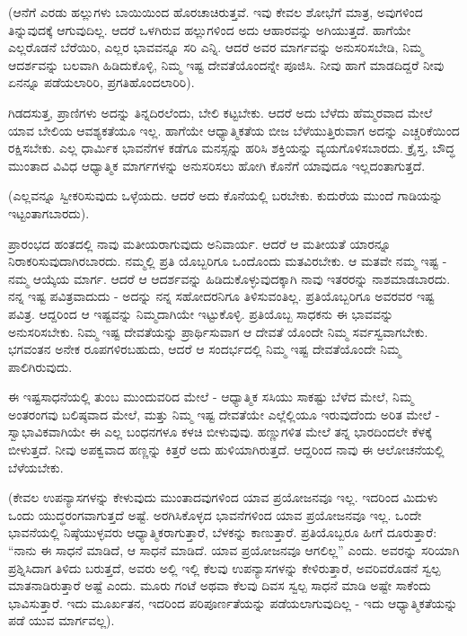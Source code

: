 (ಆನೆಗೆ ಎರಡು ಹಲ್ಲುಗಳು ಬಾಯಿಯಿಂದ ಹೊರಚಾಚಿರುತ್ತವೆ. ಇವು ಕೇವಲ ಶೋಭೆಗೆ ಮಾತ್ರ, ಅವುಗಳಿಂದ ತಿನ್ನುವುದಕ್ಕೆ ಆಗುವುದಿಲ್ಲ. ಆದರೆ ಒಳಗಿರುವ ಹಲ್ಲುಗಳಿಂದ ಅದು ಆಹಾರವನ್ನು ಅಗಿಯುತ್ತದೆ. ಹಾಗೆಯೇ ಎಲ್ಲರೊಡನೆ ಬೆರೆಯಿರಿ, ಎಲ್ಲರ ಭಾವವನ್ನೂ ಸರಿ ಎನ್ನಿ. ಆದರೆ ಅವರ ಮಾರ್ಗವನ್ನು ಅನುಸರಿಸಬೇಡಿ, ನಿಮ್ಮ ಆದರ್ಶವನ್ನು ಬಲವಾಗಿ ಹಿಡಿದುಕೊಳ್ಳಿ, ನಿಮ್ಮ ಇಷ್ಟ ದೇವತೆಯೊಂದನ್ನೇ ಪೂಜಿಸಿ. ನೀವು ಹಾಗೆ ಮಾಡದಿದ್ದರೆ ನೀವು ಏನನ್ನೂ ಪಡೆಯಲಾರಿರಿ, ಪ್ರಗತಿಹೊಂದಲಾರಿರಿ).

ಗಿಡದಸುತ್ತ, ಪ್ರಾಣಿಗಳು ಅದನ್ನು ತಿನ್ನದಿರಲೆಂದು, ಬೇಲಿ ಕಟ್ಟಬೇಕು. ಆದರೆ ಅದು ಬೆಳೆದು ಹೆಮ್ಮರವಾದ ಮೇಲೆ ಯಾವ ಬೇಲಿಯ ಆವಶ್ಯಕತೆಯೂ ಇಲ್ಲ. ಹಾಗೆಯೇ ಆಧ್ಯಾತ್ಮಿಕತೆಯ ಬೀಜ ಬೆಳೆಯುತ್ತಿರುವಾಗ ಅದನ್ನು ಎಚ್ಚರಿಕೆಯಿಂದ ರಕ್ಷಿಸಬೇಕು. ಎಲ್ಲ ಧಾರ್ಮಿಕ ಭಾವನೆಗಳ ಕಡೆಗೂ ಮನಸ್ಸನ್ನು ಹರಿಸಿ ಶಕ್ತಿಯನ್ನು ವ್ಯಯಗೊಳಿಸಬಾರದು. ಕ್ರೈಸ್ತ, ಬೌದ್ಧ ಮುಂತಾದ ವಿವಿಧ ಆಧ್ಯಾತ್ಮಿಕ ಮಾರ್ಗಗಳನ್ನು ಅನುಸರಿಸಲು ಹೋಗಿ ಕೊನೆಗೆ ಯಾವುದೂ ಇಲ್ಲದಂತಾಗುತ್ತದೆ.

(ಎಲ್ಲವನ್ನೂ ಸ್ವೀಕರಿಸುವುದು ಒಳ್ಳೆಯದು. ಆದರೆ ಅದು ಕೊನೆಯಲ್ಲಿ ಬರಬೇಕು. ಕುದುರೆಯ ಮುಂದೆ ಗಾಡಿಯನ್ನು ಇಟ್ಟಂತಾಗಬಾರದು).

ಪ್ರಾರಂಭದ ಹಂತದಲ್ಲಿ ನಾವು ಮತೀಯರಾಗುವುದು ಅನಿವಾರ್ಯ. ಆದರೆ ಆ ಮತೀಯತೆ ಯಾರನ್ನೂ ನಿರಾಕರಿಸುವುದಾಗಿರಬಾರದು. ನಮ್ಮಲ್ಲಿ ಪ್ರತಿ ಯೊಬ್ಬರಿಗೂ ಒಂದೊಂದು ಮತವಿರಬೇಕು. ಆ ಮತವೇ ನಮ್ಮ ಇಷ್ಟ - ನಮ್ಮ ಆಯ್ಕೆಯ ಮಾರ್ಗ. ಆದರೆ ಆ ಆದರ್ಶವನ್ನು ಹಿಡಿದುಕೊಳ್ಳುವುದಕ್ಕಾಗಿ ನಾವು ಇತರರನ್ನು ನಾಶಮಾಡಬಾರದು. ನನ್ನ ಇಷ್ಟ ಪವಿತ್ರವಾದುದು - ಅದನ್ನು ನನ್ನ ಸಹೋದರನಿಗೂ ತಿಳಿಸುವಂತಿಲ್ಲ. ಪ್ರತಿಯೊಬ್ಬರಿಗೂ ಅವರವರ ಇಷ್ಟ ಪವಿತ್ರ. ಆದ್ದರಿಂದ ಆ ಇಷ್ಟವನ್ನು ನಿಮ್ಮದಾಗಿಯೇ ಇಟ್ಟುಕೊಳ್ಳಿ. ಪ್ರತಿಯೊಬ್ಬ ಸಾಧಕನು ಈ ಭಾವವನ್ನು ಅನುಸರಿಸಬೇಕು. ನಿಮ್ಮ ಇಷ್ಟ ದೇವತೆಯನ್ನು ಪ್ರಾರ್ಥಿಸುವಾಗ ಆ ದೇವತೆ ಯೊಂದೇ ನಿಮ್ಮ ಸರ್ವಸ್ವವಾಗಬೇಕು. ಭಗವಂತನ ಅನೇಕ ರೂಪಗಳಿರಬಹುದು, ಆದರೆ ಆ ಸಂದರ್ಭದಲ್ಲಿ ನಿಮ್ಮ ಇಷ್ಟ ದೇವತೆಯೊಂದೇ ನಿಮ್ಮ ಪಾಲಿಗಿರುವುದು.

ಈ ಇಷ್ಟಸಾಧನೆಯಲ್ಲಿ ತುಂಬ ಮುಂದುವರಿದ ಮೇಲೆ - ಆಧ್ಯಾತ್ಮಿಕ ಸಸಿಯು ಸಾಕಷ್ಟು ಬೆಳೆದ ಮೇಲೆ, ನಿಮ್ಮ ಅಂತರಂಗವು ಬಲಿಷ್ಠವಾದ ಮೇಲೆ, ಮತ್ತು ನಿಮ್ಮ ಇಷ್ಟ ದೇವತೆಯೇ ಎಲ್ಲೆಲ್ಲಿಯೂ ಇರುವುದೆಂದು ಅರಿತ ಮೇಲೆ - ಸ್ವಾಭಾವಿಕವಾಗಿಯೇ ಈ ಎಲ್ಲ ಬಂಧನಗಳೂ ಕಳಚಿ ಬೀಳುವುವು. ಹಣ್ಣುಗಳಿತ ಮೇಲೆ ತನ್ನ ಭಾರದಿಂದಲೇ ಕೆಳಕ್ಕೆ ಬೀಳುತ್ತದೆ. ನೀವು ಅಪಕ್ವವಾದ ಹಣ್ಣನ್ನು ಕಿತ್ತರೆ ಅದು ಹುಳಿಯಾಗಿರುತ್ತದೆ. ಆದ್ದರಿಂದ ನಾವು ಈ ಆಲೋಚನೆಯಲ್ಲಿ ಬೆಳೆಯಬೇಕು.

(ಕೇವಲ ಉಪನ್ಯಾಸಗಳನ್ನು ಕೇಳುವುದು ಮುಂತಾದವುಗಳಿಂದ ಯಾವ ಪ್ರಯೋಜನವೂ ಇಲ್ಲ. ಇದರಿಂದ ಮಿದುಳು ಒಂದು ಯುದ್ಧರಂಗವಾಗುತ್ತದೆ ಅಷ್ಟೆ. ಅರಗಿಸಿಕೊಳ್ಳದ ಭಾವನೆಗಳಿಂದ ಯಾವ ಪ್ರಯೋಜನವೂ ಇಲ್ಲ. ಒಂದೇ ಭಾವನೆಯಲ್ಲಿ ನಿಷ್ಠೆಯುಳ್ಳವರು ಆಧ್ಯಾತ್ಮಿಕರಾಗುತ್ತಾರೆ, ಬೆಳಕನ್ನು ಕಾಣುತ್ತಾರೆ. ಪ್ರತಿಯೊಬ್ಬರೂ ಹೀಗೆ ದೂರುತ್ತಾರೆ: “ನಾನು ಈ ಸಾಧನೆ ಮಾಡಿದೆ, ಆ ಸಾಧನೆ ಮಾಡಿದೆ. ಯಾವ ಪ್ರಯೋಜನವೂ ಆಗಲಿಲ್ಲ” ಎಂದು. ಅವರನ್ನು ಸರಿಯಾಗಿ ಪ್ರಶ್ನಿಸಿದಾಗ ತಿಳಿದು ಬರುತ್ತದೆ, ಅವರು ಅಲ್ಲಿ ಇಲ್ಲಿ ಕೆಲವು ಉಪನ್ಯಾಸಗಳನ್ನು ಕೇಳಿರುತ್ತಾರೆ, ಅವರಿವರೊಡನೆ ಸ್ವಲ್ಪ ಮಾತನಾಡಿರುತ್ತಾರೆ ಅಷ್ಟೆ ಎಂದು. ಮೂರು ಗಂಟೆ ಅಥವಾ ಕೆಲವು ದಿವಸ ಸ್ವಲ್ಪ ಸಾಧನೆ ಮಾಡಿ ಅಷ್ಟೇ ಸಾಕೆಂದು ಭಾವಿಸುತ್ತಾರೆ. ಇದು ಮೂರ್ಖತನ, ಇದರಿಂದ ಪರಿಪೂರ್ಣತೆಯನ್ನು ಪಡೆಯಲಾಗುವುದಿಲ್ಲ - ಇದು ಆಧ್ಯಾತ್ಮಿಕತೆಯನ್ನು ಪಡೆ ಯುವ ಮಾರ್ಗವಲ್ಲ).

